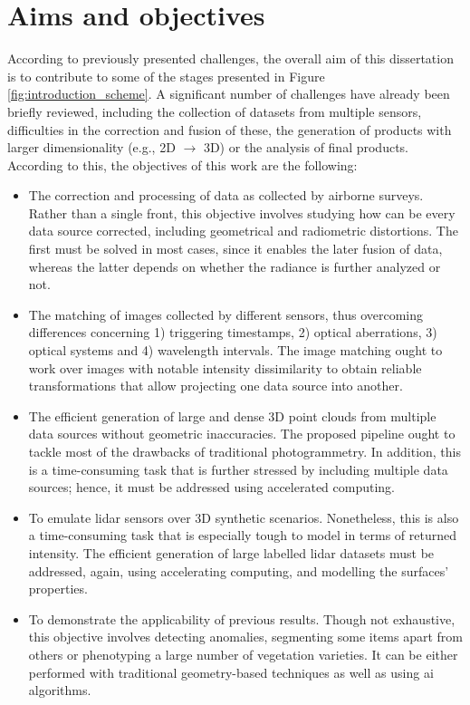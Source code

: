 \section{Aims and objectives}

According to previously presented challenges, the overall aim of this dissertation is to contribute to some of the stages presented in Figure \ref{fig:introduction_scheme}. A significant number of challenges have already been briefly reviewed, including the collection of datasets from multiple sensors, difficulties in the correction and fusion of these, the generation of products with larger dimensionality (e.g., 2D $\rightarrow$ 3D) or the analysis of final products. According to this, the objectives of this work are the following:
\begin{itemize}
    \item The correction and processing of data as collected by airborne surveys. Rather than a single front, this objective involves studying how can be every data source corrected, including geometrical and radiometric distortions. The first must be solved in most cases, since it enables the later fusion of data, whereas the latter depends on whether the radiance is further analyzed or not.
    \item The matching of images collected by different sensors, thus overcoming differences concerning 1) triggering timestamps, 2) optical aberrations, 3) optical systems and 4) wavelength intervals. The image matching ought to work over images with notable intensity dissimilarity to obtain reliable transformations that allow projecting one data source into another. 
    \item The efficient generation of large and dense 3D point clouds from multiple data sources without geometric inaccuracies. The proposed pipeline ought to tackle most of the drawbacks of traditional photogrammetry. In addition, this is a time-consuming task that is further stressed by including multiple data sources; hence, it must be addressed using accelerated computing.
    \item To emulate \acrshort{lidar} sensors over 3D synthetic scenarios. Nonetheless, this is also a time-consuming task that is especially tough to model in terms of returned intensity. The efficient generation of large labelled \acrshort{lidar} datasets must be addressed, again, using accelerating computing, and modelling the surfaces' properties.
    \item To demonstrate the applicability of previous results. Though not exhaustive, this objective involves detecting anomalies, segmenting some items apart from others or phenotyping a large number of vegetation varieties. It can be either performed with traditional geometry-based techniques as well as using \acrshort{ai} algorithms.
\end{itemize}

